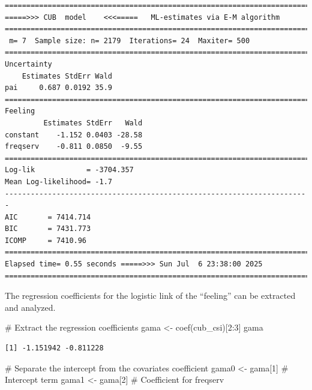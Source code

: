 \documentclass[
  letterpaper,
  DIV=11,
  numbers=noendperiod]{scrartcl}
\newenvironment{Shaded}{\begin{snugshade}}{\end{snugshade}}
\newcommand{\CommentTok}[1]{\textcolor[rgb]{0.37,0.37,0.37}{#1}}
\newcommand{\DecValTok}[1]{\textcolor[rgb]{0.68,0.00,0.00}{#1}}
\newcommand{\FunctionTok}[1]{\textcolor[rgb]{0.28,0.35,0.67}{#1}}
\newcommand{\NormalTok}[1]{\textcolor[rgb]{0.00,0.23,0.31}{#1}}
\newcommand{\OtherTok}[1]{\textcolor[rgb]{0.00,0.23,0.31}{#1}}
\newcommand{\SpecialCharTok}[1]{\textcolor[rgb]{0.37,0.37,0.37}{#1}}
\begin{document}
\begin{verbatim}
======================================================================= 
=====>>> CUB  model    <<<=====   ML-estimates via E-M algorithm   
======================================================================= 
 m= 7  Sample size: n= 2179  Iterations= 24  Maxiter= 500 
======================================================================= 
Uncertainty                                            
    Estimates StdErr Wald
pai     0.687 0.0192 35.9
======================================================================= 
Feeling                                            
         Estimates StdErr   Wald
constant    -1.152 0.0403 -28.58
freqserv    -0.811 0.0850  -9.55
======================================================================= 
Log-lik            = -3704.357 
Mean Log-likelihood= -1.7 
----------------------------------------------------------------------- 
AIC       = 7414.714 
BIC       = 7431.773 
ICOMP     = 7410.96 
======================================================================= 
Elapsed time= 0.55 seconds =====>>> Sun Jul  6 23:38:00 2025 
======================================================================= 
\end{verbatim}

The regression coefficients for the logistic link of the ``feeling'' can
be extracted and analyzed.

\begin{Shaded}
\begin{Highlighting}[]
\CommentTok{\# Extract the regression coefficients}
\NormalTok{gama }\OtherTok{\textless{}{-}} \FunctionTok{coef}\NormalTok{(cub\_csi)[}\DecValTok{2}\SpecialCharTok{:}\DecValTok{3}\NormalTok{]}
\NormalTok{gama}
\end{Highlighting}
\end{Shaded}

\begin{verbatim}
[1] -1.151942 -0.811228
\end{verbatim}

\begin{Shaded}
\begin{Highlighting}[]
\CommentTok{\# Separate the intercept from the covariate\textquotesingle{}s coefficient}
\NormalTok{gama0 }\OtherTok{\textless{}{-}}\NormalTok{ gama[}\DecValTok{1}\NormalTok{] }\CommentTok{\# Intercept term}
\NormalTok{gama1 }\OtherTok{\textless{}{-}}\NormalTok{ gama[}\DecValTok{2}\NormalTok{] }\CommentTok{\# Coefficient for freqserv}
\end{Highlighting}
\end{Shaded}
\end{document}
